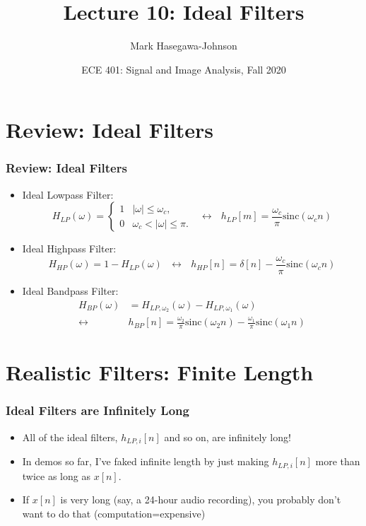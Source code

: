 \documentclass{beamer}
\title{Lecture 10: Ideal Filters}
\author{Mark Hasegawa-Johnson}
\date{ECE 401: Signal and Image Analysis, Fall 2020}
\begin{document}
\begin{frame}
  \maketitle
\end{frame}

\begin{frame}
  \tableofcontents
\end{frame}

\section[Review]{Review: Ideal Filters}
\setcounter{subsection}{1}

\begin{frame}
  \frametitle{Review: Ideal Filters}
  \begin{itemize}
  \item Ideal Lowpass Filter:
    \[
    H_{LP}(\omega)
    = \begin{cases} 1& |\omega|\le\omega_c,\\
      0 & \omega_c<|\omega|\le\pi.
    \end{cases}~~~\leftrightarrow~~~
    h_{LP}[m]=\frac{\omega_c}{\pi}\mbox{sinc}(\omega_c n)
    \]
  \item Ideal Highpass Filter:
    \[
    H_{HP}(\omega)=1-H_{LP}(\omega)~~~\leftrightarrow~~~
    h_{HP}[n]=\delta[n]-\frac{\omega_c}{\pi}\mbox{sinc}(\omega_c n)
    \]
  \item Ideal Bandpass Filter:
    \begin{align*}
      H_{BP}(\omega)&=H_{LP,\omega_2}(\omega)-H_{LP,\omega_1}(\omega)\\
      \leftrightarrow
      &h_{BP}[n]=\frac{\omega_2}{\pi}\mbox{sinc}(\omega_2 n)-\frac{\omega_1}{\pi}\mbox{sinc}(\omega_1 n)
    \end{align*}
  \end{itemize}
\end{frame}


\section[Finite-Length]{Realistic Filters: Finite Length}
\setcounter{subsection}{1}

\begin{frame}
  \frametitle{Ideal Filters are Infinitely Long}
  
  \begin{itemize}
  \item All of the ideal filters, $h_{LP,i}[n]$ and so on, are infinitely
    long!
  \item In demos so far, I've faked infinite length by just making
    $h_{LP,i}[n]$ more than twice as long as $x[n]$.
  \item If $x[n]$ is very long (say, a 24-hour audio recording), you
    probably don't want to do that (computation=expensive)
  \end{itemize}
\end{frame}
\end{document}
